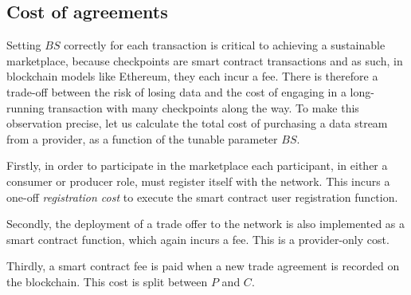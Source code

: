 \documentclass[letterpaper, 10 pt, conference]{ieeeconf}  %
\newcommand{\bs}{\ensuremath{\mathit{BS}}}
\newcommand{\ti}{\ensuremath{\mathit{TI}}}
\newcommand{\smartc}{\ensuremath{\mathit{SC}}}
\newcommand{\rtEst}{\ensuremath{\widehat{\mathit{RT}}}}
\begin{document}

\subsection{Cost of agreements}  \label{sec:cost}

Setting \bs{} correctly for each transaction is critical to achieving a sustainable marketplace, because checkpoints are smart contract transactions and as such, in blockchain models like Ethereum, they each incur a fee. There is therefore a trade-off between the risk of losing data and the cost of engaging in a long-running transaction with many checkpoints along the way.
To make this observation precise, let us calculate the total cost of purchasing a data stream from a provider, as a function of the tunable parameter \bs.

Firstly, in order to participate in the marketplace each participant, in either a consumer or producer role, must register itself with the network. 
This incurs a one-off \textit{registration cost} to execute the smart contract user registration function.

Secondly, the deployment of a trade offer to the network is also implemented as a smart contract function, which again incurs a fee. This is a provider-only cost.

Thirdly, a smart contract fee is paid when a new trade agreement is recorded on the blockchain. This cost is split between $P$ and $C$.
%
\end{document}
